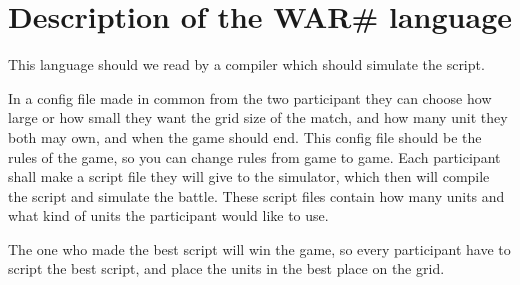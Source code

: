 
\section{ Description of the WAR\# language }

This language should we read by a compiler which should simulate the script.


In a config file made in common from the two participant they can choose how large or how small they want the grid size of the match, and how many unit they both may own, and when the game should end. This config file should be the rules of the game, so you can change rules from game to game.
Each participant shall make a script file they will give to the simulator, which then will compile the script and simulate the battle. These script files contain how many units and what kind of units the participant would like to use.

The one who made the best script will win the game, so every participant have to script the best script, and place the units in the best place on the grid.


